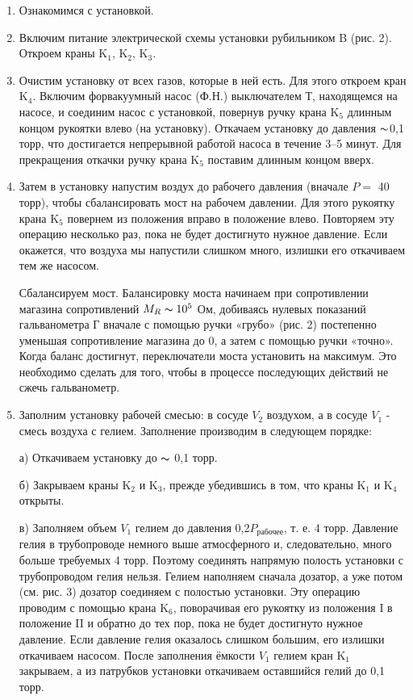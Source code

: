 \documentclass[a4paper,12pt]{article} %
\begin{document}
\begin{enumerate}
	\item Ознакомимся с установкой.
	
	\item Включим питание электрической схемы установки рубильником B (рис. 2). Откроем краны K$_{1}$, K$_{2}$, K$_{3}$.
	
	\item Очистим установку от всех газов, которые в ней есть. Для этого откроем кран K$_{4}$. Включим форвакуумный насос (Ф.Н.) выключателем Т, находящемся на насосе, и соединим насос с установкой, повернув ручку крана K$_{5}$ длинным концом рукоятки влево (на установку). Откачаем установку до давления $\thicksim$0,1 торр, что достигается непрерывной работой насоса в течение 3–5 минут. Для прекращения откачки ручку крана K$_{5}$ поставим длинным концом вверх. 
	
	\item Затем в установку напустим воздух до рабочего давления (вначале $P = $ 40 торр), чтобы сбалансировать мост на рабочем давлении. Для этого рукоятку крана K$_{5}$ повернем из положения вправо в положение влево. Повторяем эту операцию несколько раз, пока не будет достигнуто нужное давление. Если окажется, что воздуха мы напустили слишком много, излишки его откачиваем тем же насосом.
	
	
	Сбалансируем мост. Балансировку моста начинаем при сопротивлении магазина сопротивлений $M_{R} \thicksim 10^{5}$ Ом, добиваясь нулевых показаний гальванометра Г вначале с помощью ручки «грубо» (рис. 2) постепенно уменьшая сопротивление магазина до 0, а затем с помощью ручки «точно». Когда баланс достигнут, переключатели моста установить на максимум. Это необходимо сделать для того, чтобы в процессе последующих действий не сжечь гальванометр.
	
	\item Заполним установку рабочей смесью: в сосуде $V_{2}$ воздухом, а в сосуде $V_{1}$ - смесь воздуха с гелием. Заполнение производим в следующем порядке:
	
	а) Откачиваем установку до $\thicksim$ 0,1 торр.
	
	
	б) Закрываем краны K$_{2}$ и K$_{3}$, прежде убедившись в том, что краны K$_{1}$ и K$_{4}$ открыты.
	
	
	в) Заполняем объем $V_{1}$ гелием до давления 0,2$P_{\text{рабочее}}$, т. е. 4 торр. Давление гелия в трубопроводе немного выше атмосферного и, следовательно, много больше требуемых 4 торр. Поэтому соединять напрямую полость установки с трубопроводом гелия нельзя. Гелием наполняем сначала дозатор, а уже потом (см. рис. 3) дозатор соединяем с полостью установки. Эту операцию проводим с помощью крана K$_{6}$, поворачивая его рукоятку из положения I в положение II и обратно до тех пор, пока не будет достигнуто нужное давление. Если давление гелия оказалось слишком большим, его излишки откачиваем насосом. После заполнения ёмкости $V_{1}$ гелием кран K$_{1}$ закрываем, а из патрубков установки откачиваем оставшийся гелий до 0,1 торр.
	

\end{enumerate}
\end{document}
